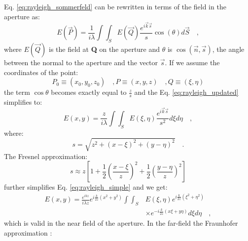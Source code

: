 Eq. \ref{eq:rayleigh_sommerfeld} can be rewritten in terms of the field in the aperture as:
\begin{equation}
\label{eq:rayleigh_updated}
E(\vec{P}) = \frac{1}{i\lambda}\int \int _S E(\vec{Q}) \frac{e^{i\vec{k}\vec{s}}}{s} \cos (\theta) d\vec{S} \quad ,
\end{equation}
where $E(\vec{Q})$ is the field at \textbf{Q} on the aperture and $\theta$ is $\cos (\vec{n},\vec{s})$, the angle between the normal to the aperture and the vector $\vec{s}$. If we assume the coordinates of the point:
\begin{subequations}
\begin{equation}
P_0 \equiv \left(x_0, y_0, z_0\right) \quad ,
\end{equation}
\begin{equation}
P \equiv \left(x, y, z\right) \quad ,
\end{equation}
\begin{equation}
Q \equiv \left( \xi , \eta \right) 
\end{equation}
\end{subequations}
the term $\cos \theta$ becomes exactly equal to $\frac{z}{s}$ and the Eq. \ref{eq:rayleigh_updated} simplifies to:
\begin{equation}
\label{eq:rayleigh_simple}
E\left( x,y\right) = \frac{z}{i\lambda}\int \int _S E(\xi,\eta) \frac{e^{i\vec{k}\vec{s}}}{s^2} d\xi d\eta \quad ,
\end{equation}
where:
\begin{equation}
s = \sqrt{z^2 + \left( x - \xi \right) ^2 + \left( y-\eta \right) ^2} \quad .
\end{equation}
The Fresnel approximation:
\begin{equation}
\label{eq:fresnel_approx}
s \approx z\left[ 1 + \frac{1}{2}\left(\frac{x-\xi}{z}\right)^2 + \frac{1}{2}\left(\frac{y-\eta}{z}\right)^2\right]
\end{equation}
further simplifies Eq. \ref{eq:rayleigh_simple} and we get:
\begin{equation}
\label{eq:fresnel_diffraction}
\begin{split}
E\left( x,y\right) = \frac{e^{ikz}}{i\lambda z}e^{i\frac{k}{2z}(x^2+y^2)}\int \int _{S} & E\left( \xi , \eta \right) e^{i\frac{k}{2z}(\xi^2+\eta ^2)} \\
& \times e^{-i\frac{k}{2z}(x\xi+y\eta)} d\xi d\eta \quad ,
\end{split}
\end{equation}
which is valid in the near field of the aperture. In the far-field the Fraunhofer approximation \cite{goodmanfourier}:
